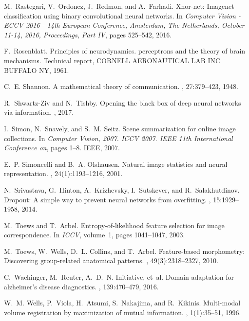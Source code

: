 \documentclass[10pt,onecolumn]{article}
\begin{document}
\begin{thebibliography}{10}
M.~Rastegari, V.~Ordonez, J.~Redmon, and A.~Farhadi.
\newblock Xnor-net: Imagenet classification using binary convolutional neural
  networks.
\newblock In {\em Computer Vision - {ECCV} 2016 - 14th European Conference,
  Amsterdam, The Netherlands, October 11-14, 2016, Proceedings, Part {IV}},
  pages 525--542, 2016.

F.~Rosenblatt.
\newblock Principles of neurodynamics. perceptrons and the theory of brain
  mechanisms.
\newblock Technical report, CORNELL AERONAUTICAL LAB INC BUFFALO NY, 1961.

C.~E. Shannon.
\newblock A mathematical theory of communication.
, 27:379--423, 1948.

R.~Shwartz-Ziv and N.~Tishby.
\newblock Opening the black box of deep neural networks via information.
, 2017.

I.~Simon, N.~Snavely, and S.~M. Seitz.
\newblock Scene summarization for online image collections.
\newblock In {\em Computer Vision, 2007. ICCV 2007. IEEE 11th International
  Conference on}, pages 1--8. IEEE, 2007.

E.~P. Simoncelli and B.~A. Olshausen.
\newblock Natural image statistics and neural representation.
, 24(1):1193--1216, 2001.

N.~Srivastava, G.~Hinton, A.~Krizhevsky, I.~Sutskever, and R.~Salakhutdinov.
\newblock Dropout: A simple way to prevent neural networks from overfitting.
, 15:1929--1958, 2014.

M.~Toews and T.~Arbel.
\newblock Entropy-of-likelihood feature selection for image correspondence.
\newblock In {\em ICCV}, volume~1, pages 1041--1047, 2003.

M.~Toews, W.~Wells, D.~L. Collins, and T.~Arbel.
\newblock Feature-based morphometry: Discovering group-related anatomical
  patterns.
, 49(3):2318--2327, 2010.

C.~Wachinger, M.~Reuter, A.~D.~N. Initiative, et~al.
\newblock Domain adaptation for alzheimer's disease diagnostics.
, 139:470--479, 2016.

W.~M. Wells, P.~Viola, H.~Atsumi, S.~Nakajima, and R.~Kikinis.
\newblock Multi-modal volume registration by maximization of mutual
  information.
, 1(1):35--51, 1996.

\end{thebibliography}
\end{document}
